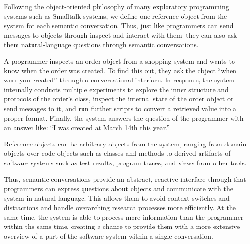 Following the object-oriented philosophy of many exploratory programming systems such as Smalltalk systems, we define one reference object from the system for each semantic conversation.
Thus, just like programmers can send messages to objects through inspect and interact with them, they can also ask them natural-language questions through semantic conversations.

\begin{example}
	A programmer inspects an order object from a shopping system and wants to know when the order was created.
	To find this out, they ask the object ``when were you created'' through a conversational interface.
	In response, the system internally conducts multiple experiments to explore the inner structure and protocols of the order's class, inspect the internal state of the order object or send messages to it, and run further scripts to convert a retrieved value into a proper format.
	Finally, the system answers the question of the programmer with an answer like: ``I was created at March 14th this year.''
\end{example}

Reference objects can be arbitrary objects from the system, ranging from domain objects over code objects such as classes and methods to derived artifacts of software systems such as test results, program traces, and views from other tools.

Thus, semantic conversations provide an abstract, reactive interface through that programmers can express questions about objects and communicate with the system in natural language.
This allows them to avoid context switches and distractions and handle overarching research processes more efficiently.
At the same time, the system is able to process more information than the programmer within the same time, creating a chance to provide them with a more extensive overview of a part of the software system within a single conversation.
